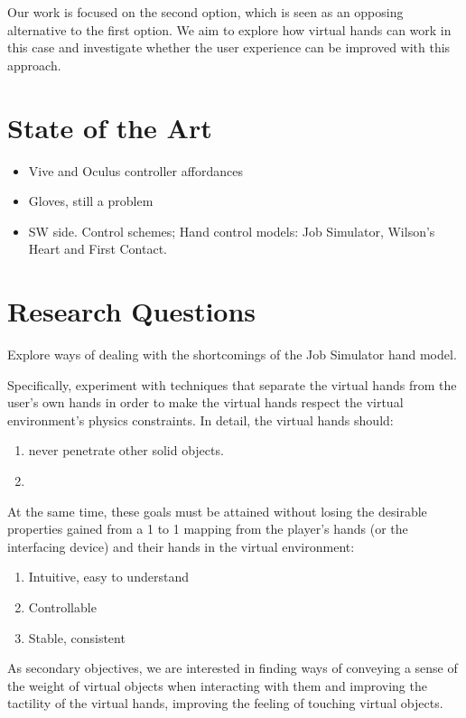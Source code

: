 Our work is focused on the second option, which is seen as an opposing alternative to the first option. We aim to explore how virtual hands can work in this case and investigate whether the user experience can be improved with this approach.

\section{State of the Art}
\label{sec:stateOfTheArt}

\begin{itemize}
\item Vive and Oculus controller affordances
\item Gloves, still a problem
\item SW side. Control schemes; Hand control models: Job Simulator, Wilson's Heart and First Contact.
\end{itemize}

\section{Research Questions}
\label{sec:researchQuestions}

Explore ways of dealing with the shortcomings of the Job Simulator hand model.

Specifically, experiment with techniques that separate the virtual hands from the user's own hands in order to make the virtual hands respect the virtual environment's physics constraints. In detail, the virtual hands should:

\begin{enumerate}
\item never penetrate other solid objects.
\item 
\end{enumerate}

At the same time, these goals must be attained without losing the desirable properties gained from a 1 to 1 mapping from the player's hands (or the interfacing device) and their hands in the virtual environment:

\begin{enumerate}
\item Intuitive, easy to understand
\item Controllable
\item Stable, consistent
\end{enumerate}

As secondary objectives, we are interested in finding ways of conveying a sense of the weight of virtual objects when interacting with them and improving the tactility of the virtual hands, improving the feeling of touching virtual objects.